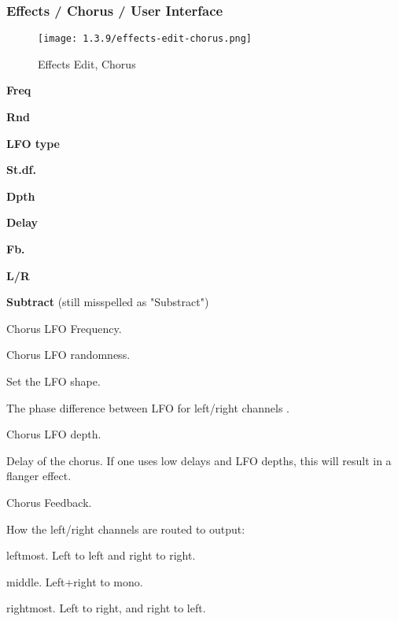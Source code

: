 \subsubsection{Effects / Chorus / User Interface}
\label{subsubsec:effects_edit_chorus_ui}

\begin{figure}[H]
   \centering 
   \texttt{[image: 1.3.9/effects-edit-chorus.png]}
   \caption{Effects Edit, Chorus}
   \label{fig:effects_edit_chorus}
\end{figure}

   \begin{enumber}
      \item \textbf{Freq}
      \item \textbf{Rnd}
      \item \textbf{LFO type}
      \item \textbf{St.df.}
      \item \textbf{Dpth}
      \item \textbf{Delay}
      \item \textbf{Fb.}
      \item \textbf{L/R}
      \item \textbf{Subtract} (still misspelled as "Substract")
   \end{enumber}

   \setcounter{ItemCounter}{0}      %

   Chorus LFO Frequency.

   Chorus LFO randomness.

   Set the LFO shape.

   The phase difference between LFO for left/right channels .

   Chorus LFO depth.

   Delay of the chorus.
   If one uses low delays and LFO depths, this will result in a flanger
   effect.

   Chorus Feedback.

   How the left/right channels are routed to output:

      \begin{enumber}
         \item leftmost. Left to left and right to right.
         \item middle. Left+right to mono.
         \item rightmost. Left to right, and right to left.
      \end{enumber}

